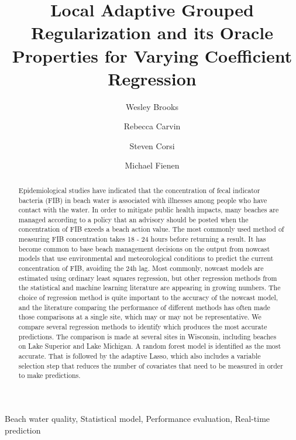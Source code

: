 \documentclass[authoryear,review, 12pt]{elsarticle}
\begin{document}
\begin{frontmatter}

\title{Local Adaptive Grouped Regularization and its Oracle Properties for Varying Coefficient Regression}

\author[usgs-wiwsc]{Wesley Brooks}

\author[usgs-wiwsc]{Rebecca Carvin}

\author[usgs-wiwsc]{Steven Corsi}

\author[usgs-wiwsc]{Michael Fienen}

\address[usgs-wiwsc]{Wisconsin Water Science Center, United States Geological Survey, 8505 Research Way, Middleton, WI 53562}

\begin{abstract}
Epidemiological studies have indicated that the concentration of fecal indicator bacteria (FIB) in beach water is associated with illnesses among people who have contact with the water. In order to mitigate public health impacts, many beaches are managed according to a policy that an advisory should be posted when the concentration of FIB exeeds a beach action value. The most commonly used method of measuring FIB concentration takes 18 - 24 hours before returning a result. It has become common to base beach management decisions on the output from nowcast models that use environmental and meteorological conditions to predict the current concentration of FIB, avoiding the 24h lag. Most commonly, nowcast models are estimated using ordinary least squares regression, but other regression methods from the statistical and machine learning literature are appearing in growing numbers. The choice of regression method is quite important to the accuracy of the nowcast model, and the literature comparing the performance of different methods has often made those comparisons at a single site, which may or may not be representative. We compare several regression methods to identify which produces the most accurate predictions. The comparison is made at several sites in Wisconsin, including beaches on Lake Superior and Lake Michigan. A random forest model is identified as the most accurate. That is followed by the adaptive Lasso, which also includes a variable selection step that reduces the number of covariates that need to be measured in order to make predictions.
\end{abstract}

\begin{keyword}
Beach water quality, Statistical model, Performance evaluation, Real-time prediction
\end{keyword}

\end{frontmatter}
\end{document}
